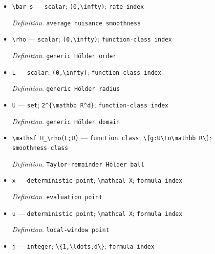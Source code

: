 \documentclass{article}
\begin{document}
\begin{itemize}
  \par\smallskip\noindent\emph{Definition.} \(\kappa=(\mathcal X,M_Y,\theta,\eta,t_0,c_f,C_f,c_\pi,c_m,C_m,L_\pi,L_0,L_\tau,\alpha,\beta,\gamma')\)
  \item \texttt{\textbackslash{}\allowbreak{}bar s} --- \texttt{scalar}; \texttt{(0,\allowbreak{}\textbackslash{}\allowbreak{}infty)}; \texttt{rate index}
  \par\smallskip\noindent\emph{Definition.} \texttt{average nuisance smoothness}
  \item \texttt{\textbackslash{}\allowbreak{}rho} --- \texttt{scalar}; \texttt{(0,\allowbreak{}\textbackslash{}\allowbreak{}infty)}; \texttt{function-\allowbreak{}class index}
  \par\smallskip\noindent\emph{Definition.} \texttt{generic Hölder order}
  \item \texttt{L} --- \texttt{scalar}; \texttt{(0,\allowbreak{}\textbackslash{}\allowbreak{}infty)}; \texttt{function-\allowbreak{}class index}
  \par\smallskip\noindent\emph{Definition.} \texttt{generic Hölder radius}
  \item \texttt{U} --- \texttt{set}; \texttt{2\textasciicircum{}\{\textbackslash{}\allowbreak{}mathbb R\textasciicircum{}d\}\allowbreak{}}; \texttt{function-\allowbreak{}class index}
  \par\smallskip\noindent\emph{Definition.} \texttt{generic Hölder domain}
  \item \texttt{\textbackslash{}\allowbreak{}mathsf H\_\allowbreak{}\textbackslash{}\allowbreak{}rho(L;\allowbreak{}U)} --- \texttt{function class}; \texttt{\textbackslash{}\allowbreak{}\{g:\allowbreak{}U\textbackslash{}\allowbreak{}to\textbackslash{}\allowbreak{}mathbb R\textbackslash{}\allowbreak{}\}\allowbreak{}}; \texttt{smoothness class}
  \par\smallskip\noindent\emph{Definition.} \texttt{Taylor-\allowbreak{}remainder Hölder ball}
  \item \texttt{x} --- \texttt{deterministic point}; \texttt{\textbackslash{}\allowbreak{}mathcal X}; \texttt{formula index}
  \par\smallskip\noindent\emph{Definition.} \texttt{evaluation point}
  \item \texttt{u} --- \texttt{deterministic point}; \texttt{\textbackslash{}\allowbreak{}mathcal X}; \texttt{formula index}
  \par\smallskip\noindent\emph{Definition.} \texttt{local-\allowbreak{}window point}
  \item \texttt{j} --- \texttt{integer}; \texttt{\textbackslash{}\allowbreak{}\{1,\allowbreak{}\textbackslash{}\allowbreak{}ldots,\allowbreak{}d\textbackslash{}\allowbreak{}\}\allowbreak{}}; \texttt{formula index}

\end{itemize}
\end{document}
